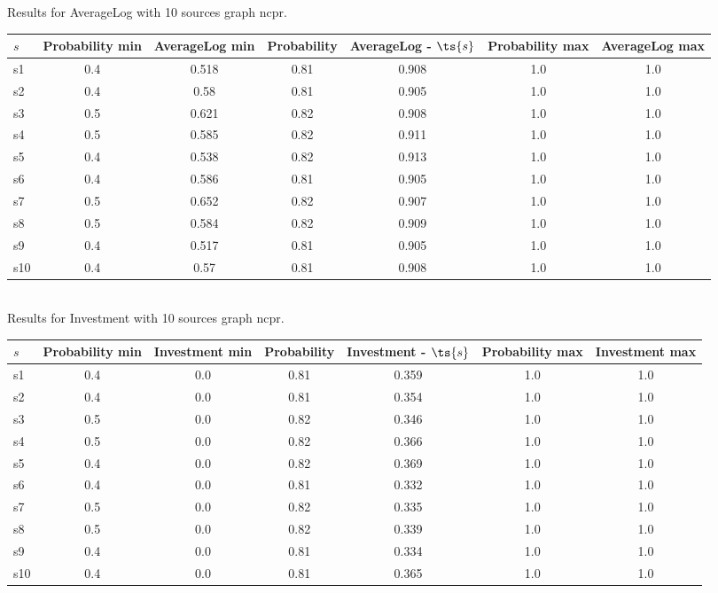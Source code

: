 \documentclass{article}
\begin{document}
\noindent Results for AverageLog with 10 sources graph ncpr.

\noindent\begin{tabular}{|l|c|c|c|c|c|c|}
\hline
$s$& Probability min & AverageLog min & Probability & AverageLog - $\ts{s}$ & Probability max & AverageLog max\\
\hline
s1 &0.4 & 0.518 & 0.81 & 0.908 & 1.0 & 1.0\\
\hline
s2 &0.4 & 0.58 & 0.81 & 0.905 & 1.0 & 1.0\\
\hline
s3 &0.5 & 0.621 & 0.82 & 0.908 & 1.0 & 1.0\\
\hline
s4 &0.5 & 0.585 & 0.82 & 0.911 & 1.0 & 1.0\\
\hline
s5 &0.4 & 0.538 & 0.82 & 0.913 & 1.0 & 1.0\\
\hline
s6 &0.4 & 0.586 & 0.81 & 0.905 & 1.0 & 1.0\\
\hline
s7 &0.5 & 0.652 & 0.82 & 0.907 & 1.0 & 1.0\\
\hline
s8 &0.5 & 0.584 & 0.82 & 0.909 & 1.0 & 1.0\\
\hline
s9 &0.4 & 0.517 & 0.81 & 0.905 & 1.0 & 1.0\\
\hline
s10 &0.4 & 0.57 & 0.81 & 0.908 & 1.0 & 1.0\\
\hline
\end{tabular}\\

\noindent Results for Investment with 10 sources graph ncpr.

\noindent\begin{tabular}{|l|c|c|c|c|c|c|}
\hline
$s$& Probability min & Investment min & Probability & Investment - $\ts{s}$ & Probability max & Investment max\\
\hline
s1 &0.4 & 0.0 & 0.81 & 0.359 & 1.0 & 1.0\\
\hline
s2 &0.4 & 0.0 & 0.81 & 0.354 & 1.0 & 1.0\\
\hline
s3 &0.5 & 0.0 & 0.82 & 0.346 & 1.0 & 1.0\\
\hline
s4 &0.5 & 0.0 & 0.82 & 0.366 & 1.0 & 1.0\\
\hline
s5 &0.4 & 0.0 & 0.82 & 0.369 & 1.0 & 1.0\\
\hline
s6 &0.4 & 0.0 & 0.81 & 0.332 & 1.0 & 1.0\\
\hline
s7 &0.5 & 0.0 & 0.82 & 0.335 & 1.0 & 1.0\\
\hline
s8 &0.5 & 0.0 & 0.82 & 0.339 & 1.0 & 1.0\\
\hline
s9 &0.4 & 0.0 & 0.81 & 0.334 & 1.0 & 1.0\\
\hline
s10 &0.4 & 0.0 & 0.81 & 0.365 & 1.0 & 1.0\\
\hline
\end{tabular}\\
\end{document}
